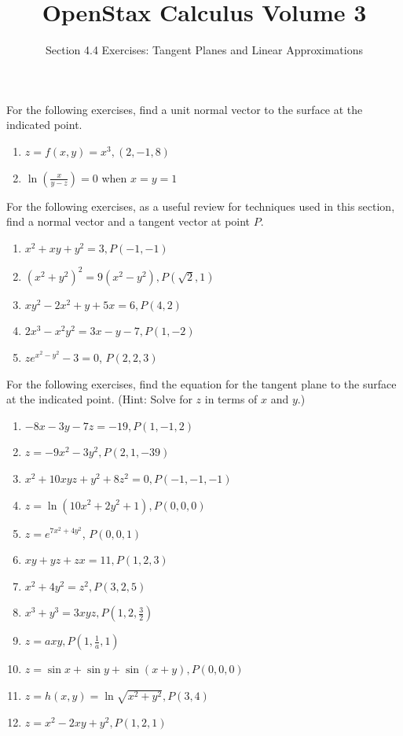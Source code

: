 \documentclass{exercises}
\title{OpenStax Calculus Volume 3}
\subtitle{Section 4.4 Exercises: Tangent Planes and Linear Approximations}
\author{}
\date{}
\begin{document}
\maketitle


For the following exercises, find a unit normal vector to the surface at the indicated point.

\begin{enumerate}[start=1]
\item $z=f(x,y)=x^{3},(2,-1,8)$
\item $\ln(\frac{x}{y-z})=0$ when $x=y=1$
\end{enumerate}

For the following exercises, as a useful review for techniques used in this section, find a normal vector and a tangent vector at point $P$.

\begin{enumerate}[resume]
\item $x^{2}+xy+y^{2}=3,P(-1,-1)$
\item ${(x^{2}+y^{2})}^{2}=9(x^{2}-y^{2}),P(\sqrt{2},1)$
\item $xy^{2}-2x^{2}+y+5x=6,P(4,2)$
\item $2x^{3}-x^{2}y^{2}=3x-y-7,P(1,-2)$
\item $ze^{x^{2}-y^{2}}-3=0$, $P(2,2,3)$
\end{enumerate}

For the following exercises, find the equation for the tangent plane to the surface at the indicated point. (Hint: Solve for $z$ in terms of $x$ and $y$.)

\begin{enumerate}[resume]
\item $-8x-3y-7z=-19,P(1,-1,2)$
\item $z=-9x^{2}-3y^{2},P(2,1,-39)$
\item $x^{2}+10xyz+y^{2}+8z^{2}=0,P(-1,-1,-1)$
\item $z=\ln(10x^{2}+2y^{2}+1),P(0,0,0)$
\item $z=e^{7x^{2}+4y^{2}}$, $P(0,0,1)$
\item $xy+yz+zx=11,P(1,2,3)$
\item $x^{2}+4y^{2}=z^{2},P(3,2,5)$
\item $x^{3}+y^{3}=3xyz,P(1,2,\frac{3}{2})$
\item $z=axy,P(1,\frac{1}{a},1)$
\item $z=\sin x+\sin y+\sin(x+y),P(0,0,0)$
\item $z=h(x,y)=\ln \sqrt{x^{2}+y^{2}},P(3,4)$
\item $z=x^{2}-2xy+y^{2},P(1,2,1)$
\end{enumerate}
\end{document}
